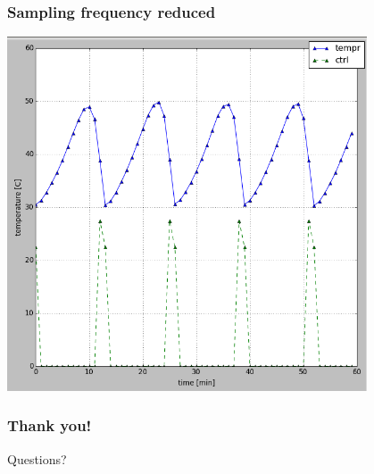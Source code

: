 \documentclass{beamer}
\begin{document}
\begin{frame}

\frametitle{Sampling frequency reduced}
\includegraphics[width=0.8\textwidth]{../images/exp_relay_slow}~
\end{frame}

\begin{frame}
\frametitle{Thank you!}
Questions?
\end{frame}
\end{document}
